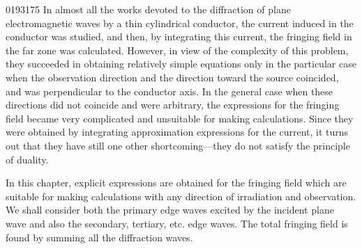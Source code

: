 \begin{scanpage}{0193}{175}
\vspace*{.13\textheight}
In almost all the works devoted to the diffraction of plane electromagnetic waves by a thin cylindrical conductor, the current induced in the conductor was studied, and then, by integrating this current, the fringing field in the far zone was calculated. However, in view of the complexity of this problem, they succeeded in obtaining relatively simple equations only in the particular case when the observation direction and the direction toward the source coincided, and was perpendicular to the conductor axis. In the general case when these directions did not coincide and were arbitrary, the expressions for the fringing field became very complicated and unsuitable for making calculations. Since they were obtained by integrating approximation expressions for the current, it turns out that they have still one other shortcoming---they do not satisfy the principle of duality.

In this chapter, explicit expressions are obtained for the fringing field which are suitable for making calculations with any direction of irradiation and observation. We shall consider both the primary edge waves excited by the incident plane wave and also the secondary, tertiary, etc. edge waves. The total fringing field is found by summing all the diffraction waves.
\end{scanpage}
